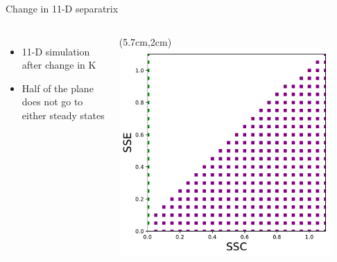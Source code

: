 \documentclass[15pt]{beamer}
\begin{document}
\begin{frame}{Change in 11-D separatrix}
\begin{columns}
\begin{itemize}
	\item 11-D simulation after change in K
	\item Half of the plane does not go to either steady states
\end{itemize}
	
	\begin{textblock*}{7.6cm}(5.7cm,2cm) %
	 \includegraphics[width=0.9\textwidth]{gLV_phases_N_change23_plot}
	\end{textblock*}
\end{columns}
\end{frame}
\end{document}
